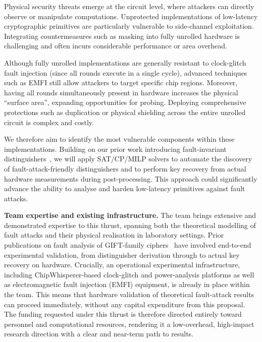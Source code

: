 Physical security threats emerge at the circuit level, where attackers can directly observe or manipulate computations.
Unprotected implementations of low-latency cryptographic primitives are particularly vulnerable to side-channel exploitation.
Integrating countermeasures such as masking into fully unrolled hardware is challenging and often incurs considerable performance or area overhead.

Although fully unrolled implementations are generally resistant to clock-glitch fault injection (since all rounds execute in a single cycle), advanced techniques such as EMFI still allow attackers to target specific chip regions.
Moreover, having all rounds simultaneously present in hardware increases the physical ``surface area'', expanding opportunities for probing.
Deploying comprehensive protections such as duplication or physical shielding across the entire unrolled circuit is complex and costly.

We therefore aim to identify the most vulnerable components within these implementations.
Building on our prior work introducing fault-invariant distinguishers~, we will apply SAT/CP/MILP solvers to automate the discovery of fault-attack-friendly distinguishers and to perform key recovery from actual hardware measurements during post-processing.
This approach could significantly advance the ability to analyse and harden low-latency primitives against fault attacks.

\medskip
\noindent\textbf{Team expertise and existing infrastructure.}
The team brings extensive and demonstrated expertise to this thrust, spanning both the theoretical modelling of fault attacks and their physical realisation in laboratory settings.
Prior publications on fault analysis of GIFT-family ciphers~ have involved end-to-end experimental validation, from distinguisher derivation through to actual key recovery on hardware.
Crucially, an operational experimental infrastructure, including ChipWhisperer-based clock-glitch and power-analysis platforms as well as electromagnetic fault injection (EMFI) equipment, is already in place within the team.
This means that hardware validation of theoretical fault-attack results can proceed immediately, without any capital expenditure from this proposal.
The funding requested under this thrust is therefore directed entirely toward personnel and computational resources, rendering it a low-overhead, high-impact research direction with a clear and near-term path to results.

